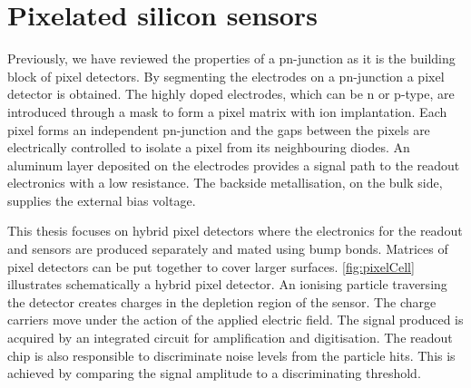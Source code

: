
\section{Pixelated silicon sensors}

Previously, we have reviewed the properties of a pn-junction as it is
the building block of pixel detectors. By segmenting the electrodes on
a pn-junction a pixel detector is obtained. The highly doped
electrodes, which can be n or p-type, are introduced through a mask to
form a pixel matrix with ion implantation. Each pixel forms an
independent pn-junction and the gaps between the pixels are
electrically controlled to isolate a pixel from its neighbouring
diodes. An aluminum layer deposited on the electrodes provides a
signal path to the readout electronics with a low resistance. The
backside metallisation, on the bulk side, supplies the external bias
voltage.

This thesis focuses on hybrid pixel detectors where the electronics
for the readout and sensors are produced separately and mated using
bump bonds. Matrices of pixel detectors can be put together to cover
larger surfaces. \cref{fig:pixelCell} illustrates schematically a
hybrid pixel detector. An ionising particle traversing the detector
creates charges in the depletion region of the sensor. The charge
carriers move under the action of the applied electric field. The
signal produced is acquired by an integrated circuit for amplification
and digitisation. The readout chip is also responsible to discriminate
noise levels from the particle hits. This is achieved by comparing the
signal amplitude to a discriminating threshold.


